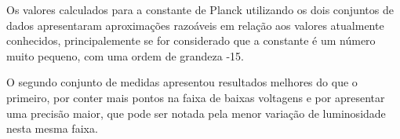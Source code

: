 \documentclass[brazilian,12pt,a4paper,final]{article}
\begin{document}
Os valores calculados para a constante de Planck utilizando os dois conjuntos
de dados apresentaram aproximações razoáveis em relação aos valores atualmente
conhecidos, principalemente se for considerado que a constante é um número
muito pequeno, com uma ordem de grandeza -15.

O segundo conjunto de medidas apresentou resultados melhores do que o 
primeiro, por conter mais pontos na faixa de baixas voltagens e por 
apresentar uma precisão maior, que pode ser notada pela menor variação
de luminosidade nesta mesma faixa.


\end{document}
